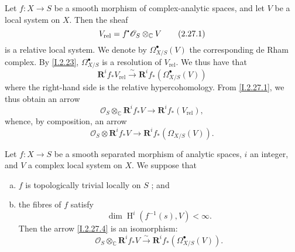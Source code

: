 \documentclass{report}
\theoremstyle{plain}
\newenvironment{proposition}[1]
    {\renewcommand\theinnercustomproposition{#1}\innercustomproposition}
    {\endinnercustomproposition}
\theoremstyle{definition}
\newenvironment{env}[1]
    {\renewcommand\theinnercustomenv{#1}\innercustomenv}
    {\endinnercustomenv}
\newcommand{\sh}[1]{{\mathscr{#1}}}
\newcommand{\sbullet}{{\mathbin{\vcenter{\hbox{\scalebox{.5}{$\bullet$}}}}}}
\newcommand{\CC}{\mathbb{C}}
\newcommand{\RR}{\mathbf{R}}
\DeclareMathOperator{\HH}{H}
\newcommand{\oldpage}[1]{\marginpar{\footnotesize$\Big\vert$ \textit{p.~#1}}}
\begin{document}
\begin{env}{2.27}
\label{I.2.27}
  Let $f\colon X\to S$ be a smooth morphism of complex-analytic spaces, and let $V$ be a local system on $X$.
  Then the sheaf
\oldpage{20}
  \[
  \label{I.2.27.1}
    V_\mathrm{rel} = f^\sbullet\sh{O}_S \otimes_\CC V
  \tag{2.27.1}
  \]
  is a relative local system.
  We denote by $\Omega_{X/S}^\bullet(V)$ the corresponding de Rham complex.
  By \cref{I.2.23}, $\Omega_{X/S}^\bullet$ is a resolution of $V_\mathrm{rel}$.
  We thus have that
  \[
  \label{I.2.27.2}
    \RR^i f_* V_\mathrm{rel} \xrightarrow{\sim} \RR^i f_*(\Omega_{X/S}^\bullet(V))
  \tag{2.27.2}
  \]
  where the right-hand side is the relative hypercohomology.
  From \cref{I.2.27.1}, we thus obtain an arrow
  \[
  \label{I.2.27.3}
    \sh{O}_S \otimes_\CC \RR^i f_*V \to \RR^i f_*(V_\mathrm{rel}),
  \tag{2.27.3}
  \]
  whence, by composition, an arrow
  \[
  \label{I.2.27.4}
    \sh{O}_S \otimes \RR^i f_*V \to \RR^i f_*(\Omega_{X/S}(V)).
  \tag{2.27.4}
  \]
\end{env}

\begin{proposition}{2.28}
\label{I.2.28}
  Let $f\colon X\to S$ be a smooth separated morphism of analytic spaces, $i$ an integer, and $V$ a complex local system on $X$.
  We suppose that
  \begin{enumerate}[a)]
    \item $f$ is topologically trivial locally on $S$ ; and
    \item the fibres of $f$ satisfy
      \[
        \dim\HH^i(f^{-1}(s),V) < \infty.
      \]
      Then the arrow \cref{I.2.27.4} is an isomorphism:
      \[
        \sh{O}_S \otimes_\CC \RR^i f_*V \xrightarrow{\sim} \RR^i f_*(\Omega_{X/S}^\bullet(V)).
      \]
  \end{enumerate}
\end{proposition}
\end{document}
